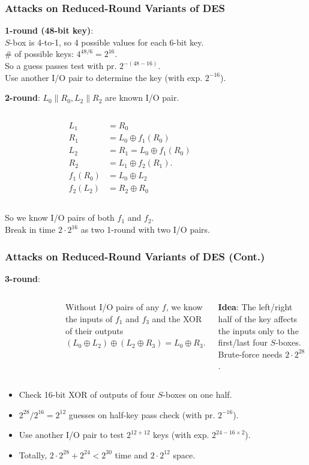 \begin{frame}\frametitle{Attacks on Reduced-Round Variants of DES}
\textbf{1-round (48-bit key)}: \\
$S$-box is 4-to-1, so 4 possible values for each 6-bit key.\\
\# of possible keys: $4^{48/6} = 2^{16}$. \\
So a guess passes test with pr. $2^{-(48-16)}$.\\
Use another I/O pair to determine the key (with exp. $2^{-16}$).
\newline

\textbf{2-round}: $L_0\|R_0, L_2\|R_2$ are known I/O pair.
\begin{columns}[C]
\begin{figure}
\begin{center}

\end{center}
\end{figure}
\[
\begin{split}
	L_1 &= R_0 \\
	R_1 &= L_0 \oplus f_1(R_0) \\
	L_2 &= R_1 = L_0 \oplus f_1(R_0) \\
	R_2 &= L_1 \oplus f_2(R_1). \\
	f_1(R_0) &= L_0 \oplus L_2 \\
	f_2(L_2) &= R_2 \oplus R_0
\end{split}
\]
\end{columns}
So we know I/O pairs of both $f_1$ and $f_2$. \\
Break in time $2\cdot 2^{16}$ as two 1-round with two I/O pairs.
\end{frame}
\begin{frame}\frametitle{Attacks on Reduced-Round Variants of DES (Cont.)}
\textbf{3-round}:
\begin{columns}[C]
\begin{figure}
\begin{center}

\end{center}
\end{figure}
Without I/O pairs of any $f$, we know the inputs of $f_1$ and $f_3$ and the XOR of their outputs $ (L_0 \oplus L_2) \oplus (L_2 \oplus R_3) = L_0 \oplus R_3.$
\newline

\textbf{Idea}: The left/right half of the key affects the inputs only to the first/last four $S$-boxes. Brute-force needs $2\cdot 2^{28}$.
\end{columns}
\begin{itemize}
\item Check 16-bit XOR of outputs of four $S$-boxes on one half.
\item $2^{28}/2^{16}=2^{12}$ guesses on half-key pass check (with pr. $2^{-16}$).
\item Use another I/O pair to test $2^{12+12}$ keys (with exp. $2^{24-16\times 2}$).
\item Totally, $2\cdot 2^{28} + 2^{24} < 2^{30}$ time and $2\cdot 2^{12}$ space.
\end{itemize}
\end{frame}
